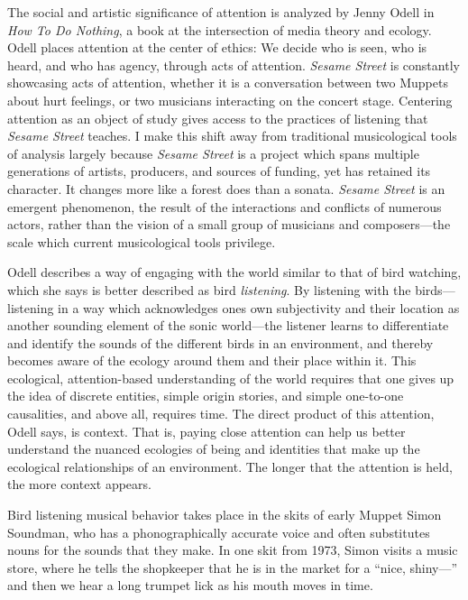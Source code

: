 \documentclass[12pt,letterpaper]{article}
\newcommand{\ses}{\textit{Sesame Street }}
\begin{document}
	The social and artistic significance of attention is analyzed by Jenny
	Odell in \textit{How To Do Nothing}, a book at the intersection of media
	theory
	and ecology. Odell places attention at the center of ethics: We decide 
	who is seen, who is heard, and who has agency, through acts of 
	attention. \autocite[154]{Odell} \ses is constantly showcasing acts of
	attention, whether it is a conversation between two Muppets about hurt
	feelings, or two musicians interacting on the concert stage. Centering 
	attention as an object of study gives access to the practices of
	listening that \ses teaches. I make this shift away from traditional
	musicological tools of analysis largely because \ses is a project which
	spans multiple generations of artists, producers, and sources of
	funding, yet has retained its character. It changes more like a forest
	does than a sonata. \ses is an emergent phenomenon, the result of the
	interactions and conflicts of numerous actors, rather than the vision
	of a small group of musicians and composers---the scale which current 
	musicological tools privilege. 

	Odell describes a way of engaging with the 
	world similar to that of bird watching, which she says is better 
	described as bird \textit{listening}.
	By listening with the birds---listening in a way which acknowledges
	ones own subjectivity and their location as another sounding element of
	the sonic world---the listener learns to differentiate and identify 
	the sounds 
	of the different birds in an environment, and thereby becomes aware
	of the ecology around them and their place within 
	it.\autocite[33/366]{Odell} 
	This ecological, attention-based understanding of the world requires 
	that one gives up the idea of discrete entities, simple origin stories,
	and simple one-to-one causalities, and above all, requires time.
	The direct product of this attention, Odell says, is context. 
	That is, paying close attention can help us better understand the 
	nuanced ecologies of being and identities that make up the ecological
	relationships of an environment. The longer that the attention is held, 
	the more context appears.\autocite[155]{Odell} 

	Bird listening musical behavior takes place in the skits of early Muppet
	Simon Soundman, who has a phonographically accurate voice and often
	substitutes nouns for the sounds that they make.  
	In one skit from 1973,\autocite{0458} Simon visits a music store, where
	he tells the shopkeeper
	that he is in the market for a ``nice, shiny---'' and then we hear a
	long trumpet lick as his mouth moves in time. 
\end{document}

